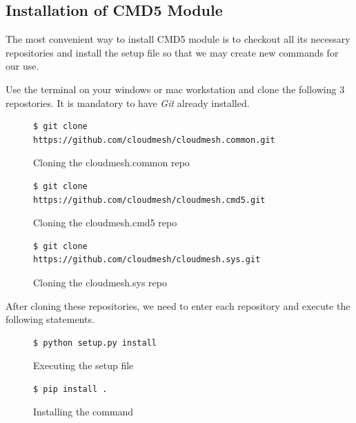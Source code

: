 \documentclass[9pt,twocolumn,twoside]{../../styles/osajnl}
\begin{document}
{\subsection{Installation of CMD5 Module}
The most convenient way to install CMD5 module is to checkout all its
necessary repositories and install the setup file so that we may
create new commands for our use.

\noindent
Use the terminal on your windows or mac workstation and clone the
following 3 repostories. It is mandatory to have \emph{Git}
\cite{www-git} already installed.

\begin{figure}[H]
\begin{verbatim}
$ git clone
https://github.com/cloudmesh/cloudmesh.common.git
\end{verbatim}
\caption{Cloning the cloudmesh.common repo}
\label{Cloning the cloudmesh.common repo}
\end{figure}

\begin{figure}[H]
\begin{verbatim}
$ git clone
https://github.com/cloudmesh/cloudmesh.cmd5.git
\end{verbatim}
\caption{Cloning the cloudmesh.cmd5 repo}
\label{Cloning the cloudmesh.cmd5 repo}
\end{figure}

\begin{figure}[H]
\begin{verbatim}
$ git clone
https://github.com/cloudmesh/cloudmesh.sys.git
\end{verbatim}
\caption{Cloning the cloudmesh.sys repo}
\label{Cloning the cloudmesh.sys repo}
\end{figure}

\noindent
After cloning these repositories, we need to enter each repository and
execute the following statements.
\newline

\begin{figure}[H]
\begin{verbatim}
$ python setup.py install
\end{verbatim}
\caption{Executing the setup file}
\label{Executing the setup file}
\end{figure}

\begin{figure}[H]
\begin{verbatim}
$ pip install .
\end{verbatim}
\caption{Installing the command}
\label{Installing the command}
\end{figure}

}
\end{document}
